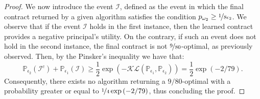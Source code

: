 \begin{proof}
		
	We now introduce the event $\mathcal{I}$, defined as the event in which the final contract returned by a given algorithm satisfies the condition $p_{\omega_2} \ge \nicefrac{1}{8 \epsilon_2}$. We observe that if the event $\mathcal{I}$ holds in the first instance, then the learned contract provides a negative principal's utility. On the contrary, if such an event does not hold in the second instance, the final contract is not $\nicefrac{9}{80}$-optimal, as previously observed. Then, by the Pinsker's inequality we have that:
		\begin{equation}
		\mathbb{P}_{\epsilon_2} (\mathcal{I}^c )+ \mathbb{P}_{\epsilon_1}(  \mathcal{I}) \ge \frac{1}{2} \exp{(- \mathcal{KL}(\mathbb{P}_{\epsilon_1}, \mathbb{P}_{\epsilon_2})) } = \frac{1}{2} \exp{(-2/ 79)}.
		\end{equation} 
		Consequently, there exists no algorithm returning a $9/80$-optimal with a probability greater or equal to $\nicefrac{1}{4} \exp{(-2/79)}$, thus concluding the proof.

\end{proof}
